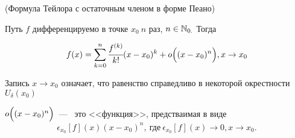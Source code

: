\begin{theorem}
	\hypertarget{thrm5.14}{(Формула Тейлора с остаточным членом в форме Пеано)} Путь $f$ дифференцируемо в точке $x_{0} \ n$ раз, $n \in \mathbb{N}_{0.}$ Тогда 
	
	$$f(x) = \sum\limits_{k = 0}^n \cfrac{f^{(k)}}{k!}(x-x_{0})^{k} + o\Bigl( (x-x_{0})^{n} \Bigr), x \to x_{0}$$
\begin{note}
	Запись $x\to x_{0}$ означает, что равенство справедливо в некоторой окрестности $U_{\delta}(x_{0})$
	
	$o\Bigl( (x-x_{0})^{n} \Bigr)$~---~ это <<функция>>, предстваимая в виде $$\epsilon_{x_{0}}[f](x)(x-x_{0})^{n}, \ \textrm{где} \ \epsilon_{x_{0}}[f](x) \to 0, x\to x_{0}.$$
\end{note}	

\end{theorem}
